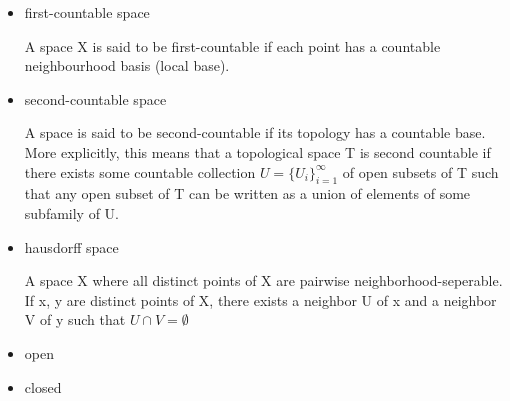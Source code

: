 \documentclass[10pt,a4paper]{book}
\begin{document}
\begin{itemize}
	\item first-countable space
	
	A space X is said to be first-countable if each point has a countable neighbourhood basis (local base).
	
	\item second-countable space
	
	A space is said to be second-countable if its topology has a countable base. More explicitly, this means that a topological space  T is second countable if there exists some countable collection $ U=\{U_{i}\}_{i=1}^{\infty }$ of open subsets of T such that any open subset of  T can be written as a union of elements of some subfamily of U.
	
	\item hausdorff space
	
	A space X where all distinct points of X are pairwise neighborhood-seperable. If x, y are distinct points of X, there exists a neighbor U of x and a neighbor V of y such that $U \cap V = \emptyset $
	
	\item open
	
	\item closed
	
	
\end{itemize}
\end{document}
